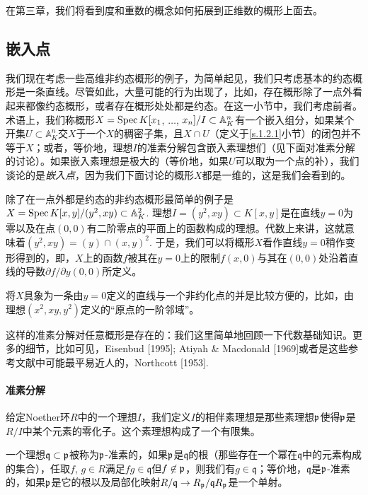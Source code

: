 在第三章，我们将看到度和重数的概念如何拓展到正维数的概形上面去。

\subsection{嵌入点}

我们现在考虑一些高维非约态概形的例子，为简单起见，我们只考虑基本的约态概形是一条直线。\nottran 尽管如此，大量可能的行为出现了，比如，存在概形除了一点外看起来都像约态概形，或者存在概形处处都是约态。在这一小节中，我们考虑前者。术语上，我们称概形$X=\operatorname{Spec} K[x_1$, $\dots$, $x_n]/I\subset \mathbb{A}_{K}^n$有一个嵌入组分，如果某个开集$U\subset \mathbb{A}^n_K$交$X$于一个$X$的稠密子集，且$X\cap U$（定义于\ref{s.1.2.1}小节）的闭包并不等于$X$；或者，等价地，理想$I$的准素分解包含嵌入素理想们（见下面对准素分解的讨论）。如果嵌入素理想是极大的（等价地，如果$U$可以取为一个点的补），我们谈论的是\textit{嵌入点}，因为我们下面讨论的概形$X$都是一维的，这是我们会看到的。\nottran

除了在一点外都是约态的非约态概形最简单的例子是$X=\operatorname{Spec} K[x,y]/(y^2,xy)\subset \mathbb{A}_K^2$. 理想$I=(y^2,xy)\subset K[x,y]$是在直线$y=0$为零以及在点$(0,0)$有二阶零点的平面上的函数构成的理想。代数上来讲，这就意味着$(y^2,xy)=(y)\cap (x,y)^2$. 于是，我们可以将概形$X$看作直线$y=0$稍作变形得到的，即，$X$上的函数$f$被其在$y=0$上的限制$f(x,0)$与其在$(0,0)$处沿着直线的导数$\partial f/\partial y(0,0)$所定义。

将$X$具象为一条由$y=0$定义的直线与一个非约化点的并是比较方便的，比如，由理想$(x^2,xy,y^2)$定义的“原点的一阶邻域”。


这样的准素分解对任意概形是存在的：我们这里简单地回顾一下代数基础知识。更多的细节，比如可见，Eisenbud [1995]; Atiyah \& Macdonald [1969]或者是这些参考文献中可能最平易近人的，Northcott [1953].

\paragraph*{准素分解} 
给定Noether环$R$中的一个理想$I$，我们定义$I$的相伴素理想是那些素理想$\mathfrak{p}$使得$\mathfrak{p}$是$R/I$中某个元素的零化子。这个素理想构成了一个有限集。

一个理想$\mathfrak{q}\subset \mathfrak{p}$被称为$\mathfrak{p}$-准素的，如果$\mathfrak{p}$是$\mathfrak{q}$的根（那些存在一个幂在$\mathfrak{q}$中的元素构成的集合），任取$f$, $g\in R$满足$fg\in \mathfrak{q}$但$f\not\in \mathfrak{p}$，则我们有$g\in\mathfrak{q}$；等价地，$\mathfrak{q}$是$\mathfrak{p}$-准素的，如果$\mathfrak{p}$是它的根以及局部化映射$R/\mathfrak{q}\to R_{\mathfrak{p}}/\mathfrak{q}R_{\mathfrak{p}}$是一个单射。

